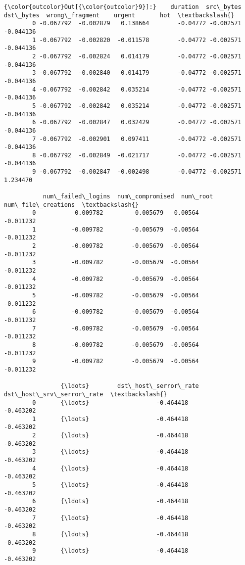 \documentclass[11pt]{article}
\begin{document}
\begin{Verbatim}[commandchars=\\\{\}]
{\color{outcolor}Out[{\color{outcolor}9}]:}    duration  src\_bytes  dst\_bytes  wrong\_fragment    urgent       hot  \textbackslash{}
        0 -0.067792  -0.002879   0.138664        -0.04772 -0.002571 -0.044136   
        1 -0.067792  -0.002820  -0.011578        -0.04772 -0.002571 -0.044136   
        2 -0.067792  -0.002824   0.014179        -0.04772 -0.002571 -0.044136   
        3 -0.067792  -0.002840   0.014179        -0.04772 -0.002571 -0.044136   
        4 -0.067792  -0.002842   0.035214        -0.04772 -0.002571 -0.044136   
        5 -0.067792  -0.002842   0.035214        -0.04772 -0.002571 -0.044136   
        6 -0.067792  -0.002847   0.032429        -0.04772 -0.002571 -0.044136   
        7 -0.067792  -0.002901   0.097411        -0.04772 -0.002571 -0.044136   
        8 -0.067792  -0.002849  -0.021717        -0.04772 -0.002571 -0.044136   
        9 -0.067792  -0.002847  -0.002498        -0.04772 -0.002571  1.234470   
        
           num\_failed\_logins  num\_compromised  num\_root  num\_file\_creations  \textbackslash{}
        0          -0.009782        -0.005679  -0.00564           -0.011232   
        1          -0.009782        -0.005679  -0.00564           -0.011232   
        2          -0.009782        -0.005679  -0.00564           -0.011232   
        3          -0.009782        -0.005679  -0.00564           -0.011232   
        4          -0.009782        -0.005679  -0.00564           -0.011232   
        5          -0.009782        -0.005679  -0.00564           -0.011232   
        6          -0.009782        -0.005679  -0.00564           -0.011232   
        7          -0.009782        -0.005679  -0.00564           -0.011232   
        8          -0.009782        -0.005679  -0.00564           -0.011232   
        9          -0.009782        -0.005679  -0.00564           -0.011232   
        
                {\ldots}        dst\_host\_serror\_rate  dst\_host\_srv\_serror\_rate  \textbackslash{}
        0       {\ldots}                   -0.464418                 -0.463202   
        1       {\ldots}                   -0.464418                 -0.463202   
        2       {\ldots}                   -0.464418                 -0.463202   
        3       {\ldots}                   -0.464418                 -0.463202   
        4       {\ldots}                   -0.464418                 -0.463202   
        5       {\ldots}                   -0.464418                 -0.463202   
        6       {\ldots}                   -0.464418                 -0.463202   
        7       {\ldots}                   -0.464418                 -0.463202   
        8       {\ldots}                   -0.464418                 -0.463202   
        9       {\ldots}                   -0.464418                 -0.463202   
        

\end{Verbatim}
\end{document}
